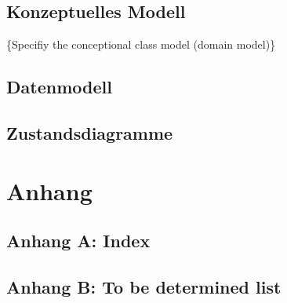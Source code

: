 \subsection{Konzeptuelles Modell}
\{Specifiy the conceptional class model (domain model)\}

\subsection{Datenmodell}

\subsection{Zustandsdiagramme}

\newpage

\setcounter{secnumdepth}{0}
\section{Anhang}

\subsection{Anhang A: Index}

\subsection{Anhang B: To be determined list}

